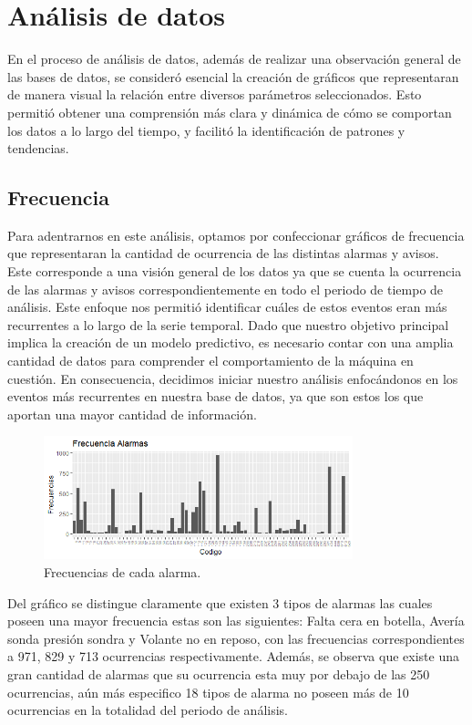 \documentclass[10pt]{article}
\begin{document}
\section{Análisis de datos}

En el proceso de análisis de datos, además de realizar una observación general de las bases de datos, se consideró esencial la creación de gráficos que representaran de manera visual la relación entre diversos parámetros seleccionados. Esto permitió obtener una comprensión más clara y dinámica de cómo se comportan los datos a lo largo del tiempo, y facilitó la identificación de patrones y tendencias.

\subsection{Frecuencia}
Para adentrarnos en este análisis, optamos por confeccionar gráficos de frecuencia que representaran la cantidad de ocurrencia de las distintas alarmas y avisos. Este corresponde a una visión general de los datos ya que se cuenta la ocurrencia de las alarmas y avisos correspondientemente en todo el periodo de tiempo de análisis. Este enfoque nos permitió identificar cuáles de estos eventos eran más recurrentes a lo largo de la serie temporal. Dado que nuestro objetivo principal implica la creación de un modelo predictivo, es necesario contar con una amplia cantidad de datos para comprender el comportamiento de la máquina en cuestión. En consecuencia, decidimos iniciar nuestro análisis enfocándonos en los eventos más recurrentes en nuestra base de datos, ya que son estos los que aportan una mayor cantidad de información.\\

\begin{figure}[H]
\includegraphics[width=0.8\textwidth]{Graficos/FrecuenciaAlarmas.png}
  \caption{Frecuencias de cada alarma.}
\end{figure}

Del gráfico se distingue claramente que existen 3 tipos de alarmas las cuales poseen una mayor frecuencia estas son las siguientes: Falta cera en botella, Avería sonda presión sondra y Volante no en reposo, con las frecuencias correspondientes a 971, 829 y 713 ocurrencias respectivamente. Además, se observa que existe una gran cantidad de alarmas que su ocurrencia esta muy por debajo de las 250 ocurrencias, aún más especifico 18 tipos de alarma no poseen más de 10 ocurrencias en la totalidad del periodo de análisis.\\
\end{document}

